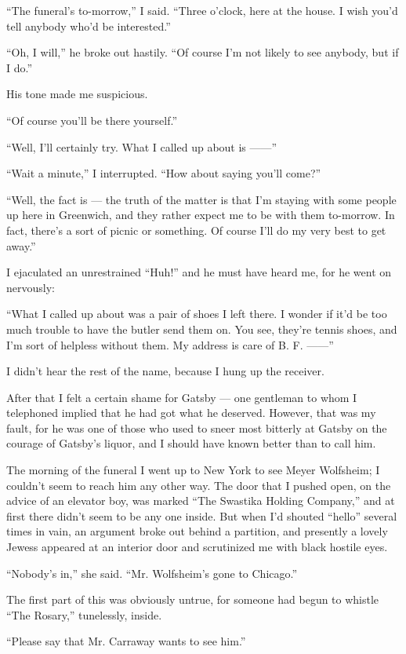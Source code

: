 \documentclass{znotebook}
\begin{document}
``The funeral's to-morrow,'' I said. ``Three o'clock, here at the house. I wish you'd tell anybody who'd be interested.''

``Oh, I will,'' he broke out hastily. ``Of course I'm not likely to see anybody, but if I do.''

His tone made me suspicious.

``Of course you'll be there yourself.''

``Well, I'll certainly try. What I called up about is ——''

``Wait a minute,'' I interrupted. ``How about saying you'll come?''

``Well, the fact is — the truth of the matter is that I'm staying with some people up here in Greenwich, and they rather expect me to be with them to-morrow. In fact, there's a sort of picnic or something. Of course I'll do my very best to get away.''

I ejaculated an unrestrained ``Huh!'' and he must have heard me, for he went on nervously:

``What I called up about was a pair of shoes I left there. I wonder if it'd be too much trouble to have the butler send them on. You see, they're tennis shoes, and I'm sort of helpless without them. My address is care of B. F. ——''

I didn't hear the rest of the name, because I hung up the receiver.

After that I felt a certain shame for Gatsby — one gentleman to whom I telephoned implied that he had got what he deserved. However, that was my fault, for he was one of those who used to sneer most bitterly at Gatsby on the courage of Gatsby's liquor, and I should have known better than to call him.

The morning of the funeral I went up to New York to see Meyer Wolfsheim; I couldn't seem to reach him any other way. The door that I pushed open, on the advice of an elevator boy, was marked ``The Swastika Holding Company,'' and at first there didn't seem to be any one inside. But when I'd shouted ``hello'' several times in vain, an argument broke out behind a partition, and presently a lovely Jewess appeared at an interior door and scrutinized me with black hostile eyes.

``Nobody's in,'' she said. ``Mr. Wolfsheim's gone to Chicago.''

The first part of this was obviously untrue, for someone had begun to whistle ``The Rosary,'' tunelessly, inside.

``Please say that Mr. Carraway wants to see him.''
\end{document}
